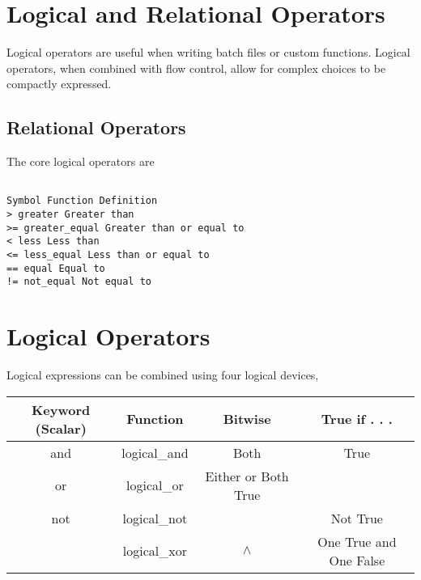 \documentclass[KSmain.tex]{subfiles}
\begin{document}
 

\section{Logical and Relational Operators}
Logical operators are useful when writing batch files or custom functions. Logical operators, when combined
with flow control, allow for complex choices to be compactly expressed.

\subsection{Relational Operators}


The core logical operators are
\begin{verbatim}

Symbol Function Definition
> greater Greater than
>= greater_equal Greater than or equal to
< less Less than
<= less_equal Less than or equal to
== equal Equal to
!= not_equal Not equal to
\end{verbatim}

\section{Logical Operators}

Logical expressions can be combined using four logical devices,

\begin{tabular}{|c|c|c|c|}
	\hline Keyword (Scalar) & Function & Bitwise & True if . . . \\ \hline
	and & logical\_and & Both & True \\ \hline
	or  & logical\_or & Either or Both True \\ \hline
	not & logical\_not & ~ & Not True \\ \hline
	& logical\_xor & $\wedge$ & One True and One False \\ \hline
\end{tabular} 
\end{document}
